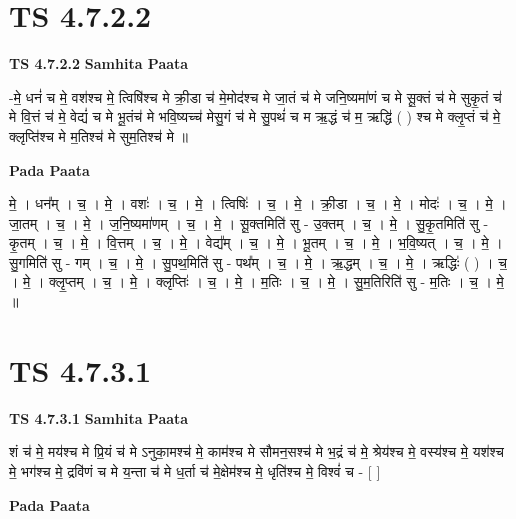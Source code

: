\documentclass[17pt]{extarticle}
\begin{document}

\section{ TS 4.7.2.2 }

\textbf{TS 4.7.2.2 } \newline
\textbf{Samhita Paata} \newline

-मे॒ धनं॑ च मे॒ वश॑श्च मे॒ त्विषि॑श्च मे क्री॒डा च॑ मे॒मोद॑श्च मे जा॒तं च॑ मे जनि॒ष्यमा॑णं च मे सू॒क्तं च॑ मे सुकृ॒तं च॑ मे वि॒त्तं च॑ मे॒ वेद्यं॑ च मे भू॒तंच॑ मे भवि॒ष्यच्च॑ मेसु॒गं च॑ मे सु॒पथं॑ च म ऋ॒द्धं च॑ म॒ ऋद्धि॑ ( ) श्च मे क्लृ॒प्तं च॑ मे॒    क्लृप्ति॑श्च मे म॒तिश्च॑ मे सुम॒तिश्च॑ मे ॥ \newline

\textbf{Pada Paata} \newline

मे॒ । धन᳚म् । च॒ । मे॒ । वशः॑ । च॒ । मे॒ । त्विषिः॑ । च॒ । मे॒ । क्री॒डा । च॒ । मे॒ । मोदः॑ । च॒ । मे॒ । जा॒तम् । च॒ । मे॒ । ज॒नि॒ष्यमा॑णम् । च॒ । मे॒ । सू॒क्तमिति॑ सु - उ॒क्तम् । च॒ । मे॒ । सु॒कृ॒तमिति॑ सु - कृ॒तम् । च॒ । मे॒ । वि॒त्तम् । च॒ । मे॒ । वेद्य᳚म् । च॒ । मे॒ । भू॒तम् । च॒ । मे॒ । भ॒वि॒ष्यत् । च॒ । मे॒ । सु॒गमिति॑ सु - गम् । च॒ । मे॒ । सु॒पथ॒मिति॑ सु - पथ᳚म् । च॒ । मे॒ । ऋ॒द्धम् । च॒ । मे॒ । ऋद्धिः॑ ( ) । च॒ । मे॒ । क्लृ॒प्तम् । च॒ । मे॒ । क्लृप्तिः॑ । च॒ । मे॒ । म॒तिः । च॒ । मे॒ । सु॒म॒तिरिति॑ सु - म॒तिः । च॒ । मे॒ ॥  \newline





\section{ TS 4.7.3.1 }

\textbf{TS 4.7.3.1 } \newline
\textbf{Samhita Paata} \newline

शं च॑ मे॒ मय॑श्च मे प्रि॒यं च॑ मे ऽनुका॒मश्च॑ मे॒ काम॑श्च मे     सौमन॒सश्च॑ मे भ॒द्रं च॑ मे॒ श्रेय॑श्च मे॒ वस्य॑श्च मे॒   यश॑श्च मे॒ भग॑श्च मे॒ द्रवि॑णं च मे य॒न्ता च॑ मे ध॒र्ता च॑ मे॒क्षेम॑श्च मे॒ धृति॑श्च मे॒ विश्वं॑ च - [  ] \newline

\textbf{Pada Paata} \newline
\end{document}
